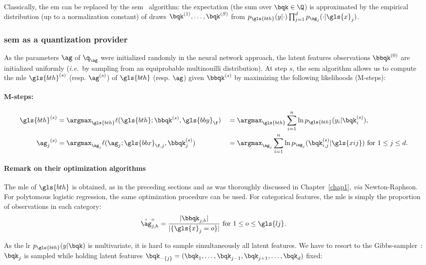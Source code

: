 Classically, the \gls{em} can be replaced by the \acrlong{sem}~\cite{celeux1985sem} algorithm: the expectation (the sum over $\bqk \in \Q$) is approximated by the empirical distribution (up to a normalization constant) of draws $\bqk^{(1)}, \dots, \bqk^{(S)}$ from $p_{\gls{bth}}(y | \cdot) \prod_{j=1}^d p_{\ag_j}(\cdot | \gls{x}_j)$.

\subsubsection{\gls{sem} as a quantization provider}

As the parameters $\ag$ of $\q_{\ag}$ were initialized randomly in the neural network approach, the latent features observations $\bbqk^{(0)}$ are initialized uniformly (\textit{i.e.}\ by sampling from an equiprobable multinouilli distribution). At step $s$, the \gls{sem} algorithm allows us to compute the \gls{mle} ${\gls{bth}}^{(s)}$ (resp. ${\ag}^{(s)}$) of $\gls{bth}$ (resp. $\ag$) given $\bbqk^{(s)}$ by maximizing the following likelihoods (M-steps):
\paragraph{M-steps:}
\begin{alignat}{2}
{\gls{bth}}^{(s)} & = \argmax_{\gls{bth}} \ell(\gls{bth}; \bbqk^{(s)}, \gls{bby}_\f) && = \argmax_{\gls{bth}} \sum_{i=1}^n \ln p_{\gls{bth}}(y_i | \bqk^{(s)}_i), \nonumber \\
{\ag_j}^{(s)} & = \argmax_{\ag_j} \ell(\ag_j; \gls{bbx}_{\f,j}, \bbqk^{(s)}_j) && = \argmax_{\ag_j} \sum_{i=1}^n \ln p_{\ag_j}(\bqk^{(s)}_{i,j} | \gls{xij}) \text{ for } 1 \leq j \leq d. \label{eq:mle_ag}
\end{alignat}

\paragraph{Remark on their optimization algorithms}

The \gls{mle} of $\gls{bth}$ is obtained, as in the preceding sections and as was thoroughly discussed in Chapter~\ref{chap1}, \textit{via} Newton-Raphson. For polytomous logistic regression, the same optimization procedure can be used. For categorical features, the \gls{mle} is simply the proportion of observations in each category:
\[ \hat{\ag}_{j,h}^o = \frac{|\bbqk_{j,h}|}{|\{\gls{x}_j=o\}|} \text{ for } 1 \leq o \leq \gls{lj}. \]

As the \gls{lr} $p_{\gls{bth}}(y | \bqk)$ is multivariate, it is hard to sample simultaneously all latent features. We have to resort to the Gibbs-sampler~\cite{casella1992explaining}: $\bqk_j$ is sampled while holding latent features $\bqk_{-\{j\}} = (\bqk_1, \dots, \bqk_{j-1}, \bqk_{j+1}, \dots, \bqk_d)$ fixed:
